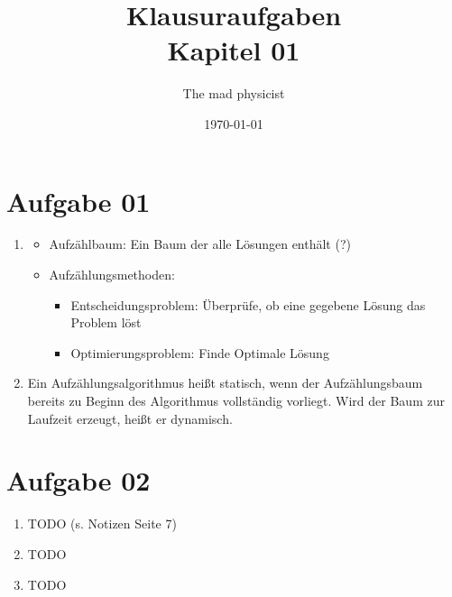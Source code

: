 \documentclass[10pt,a4paper]{article}
\begin{document}
\title{Klausuraufgaben \\
\small{Kapitel 01}}
\author{The mad physicist}
\date{\today}
\maketitle

\section*{Aufgabe 01}
    \begin{enumerate}[label={\alph*)}]
        \item
            \begin{itemize}
                \item Aufz\"ahlbaum: Ein Baum der alle L\"osungen
                    enth\"alt (?)
                \item Aufz\"ahlungsmethoden: \\
                    \begin{itemize}
                        \item Entscheidungsproblem: 
                            \"Uberpr\"ufe, ob eine 
                            gegebene L\"osung das
                            Problem l\"ost
                        \item Optimierungsproblem:
                            Finde Optimale L\"osung
                    \end{itemize}

            \end{itemize}

        \item Ein Aufz\"ahlungsalgorithmus hei\ss t statisch, wenn der
            Aufz\"ahlungsbaum bereits zu Beginn des Algorithmus vollst\"andig 
            vorliegt. Wird der Baum zur Laufzeit erzeugt, hei\ss t er dynamisch.
    \end{enumerate}
    
\section*{Aufgabe 02}
    \begin{enumerate}[label={\alph*)}]
        
        \item TODO (s. Notizen Seite 7)
        
        \item TODO
        
        \item TODO
        
    \end{enumerate}
\end{document}
